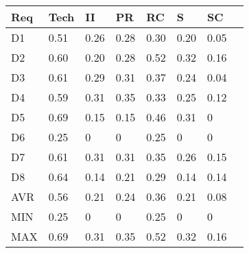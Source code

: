 \begin{tabularx}{\columnwidth}{|l|X|X|X|X|X|X|X|}
\hline
Req	& Tech & II   & PR   & RC   & S    & SC	   \\\hline
D1	& 0.51 & 0.26 & 0.28 & 0.30 & 0.20 & 0.05  \\\hline
D2	& 0.60 & 0.20 & 0.28 & 0.52 & 0.32 & 0.16  \\\hline
D3	& 0.61 & 0.29 & 0.31 & 0.37 & 0.24 & 0.04  \\\hline
D4	& 0.59 & 0.31 & 0.35 & 0.33 & 0.25 & 0.12  \\\hline
D5	& 0.69 & 0.15 & 0.15 & 0.46 & 0.31 & 0     \\\hline
D6	& 0.25 & 0    & 0    & 0.25 & 0    & 0     \\\hline
D7	& 0.61 & 0.31 & 0.31 & 0.35 & 0.26 & 0.15  \\\hline
D8	& 0.64 & 0.14 & 0.21 & 0.29 & 0.14 & 0.14  \\\hline
AVR	& 0.56 & 0.21 & 0.24 & 0.36 & 0.21 & 0.08  \\\hline
MIN	& 0.25 & 0    & 0    & 0.25 & 0    & 0     \\\hline
MAX	& 0.69 & 0.31 & 0.35 & 0.52 & 0.32 & 0.16  \\\hline
\end{tabularx}